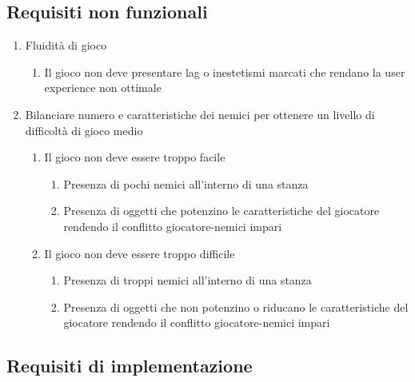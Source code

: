 \subsection{Requisiti non funzionali}

\begin{enumerate}
    \item Fluidità di gioco
    \begin{enumerate}
        \item Il gioco non deve presentare lag o inestetismi marcati che rendano la user experience non ottimale
    \end{enumerate}
    \item Bilanciare numero e caratteristiche dei nemici per ottenere un livello di difficoltà di gioco medio
    \begin{enumerate}
        \item Il gioco non deve essere troppo facile 
        \begin{enumerate}
            \item Presenza di pochi nemici all'interno di una stanza
            \item Presenza di oggetti che potenzino le caratteristiche del giocatore rendendo il conflitto giocatore-nemici impari
        \end{enumerate}
        \item Il gioco non deve essere troppo difficile
        \begin{enumerate}
            \item Presenza di troppi nemici all'interno di una stanza
            \item Presenza di oggetti che non potenzino o riducano le caratteristiche del giocatore rendendo il conflitto giocatore-nemici impari
        \end{enumerate}
    \end{enumerate}
\end{enumerate}


\subsection{Requisiti di implementazione}

